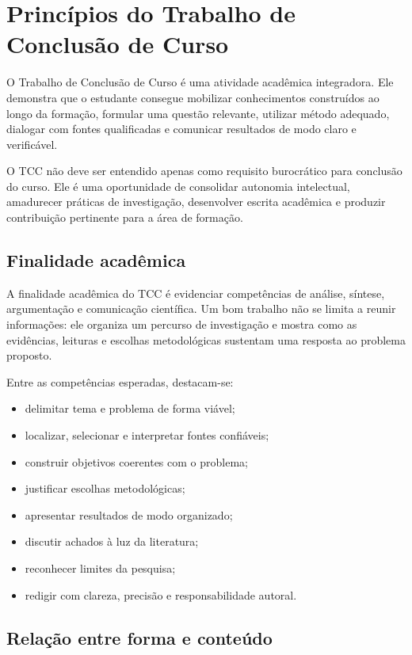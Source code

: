 \chapter{Princípios do Trabalho de Conclusão de Curso}

O Trabalho de Conclusão de Curso é uma atividade acadêmica integradora. Ele demonstra que o estudante consegue mobilizar conhecimentos construídos ao longo da formação, formular uma questão relevante, utilizar método adequado, dialogar com fontes qualificadas e comunicar resultados de modo claro e verificável.

O TCC não deve ser entendido apenas como requisito burocrático para conclusão do curso. Ele é uma oportunidade de consolidar autonomia intelectual, amadurecer práticas de investigação, desenvolver escrita acadêmica e produzir contribuição pertinente para a área de formação.

\section{Finalidade acadêmica}

A finalidade acadêmica do TCC é evidenciar competências de análise, síntese, argumentação e comunicação científica. Um bom trabalho não se limita a reunir informações: ele organiza um percurso de investigação e mostra como as evidências, leituras e escolhas metodológicas sustentam uma resposta ao problema proposto.

Entre as competências esperadas, destacam-se:

\begin{itemize}
  \item delimitar tema e problema de forma viável;
  \item localizar, selecionar e interpretar fontes confiáveis;
  \item construir objetivos coerentes com o problema;
  \item justificar escolhas metodológicas;
  \item apresentar resultados de modo organizado;
  \item discutir achados à luz da literatura;
  \item reconhecer limites da pesquisa;
  \item redigir com clareza, precisão e responsabilidade autoral.
\end{itemize}

\section{Relação entre forma e conteúdo}


